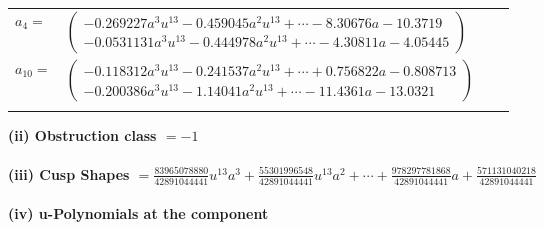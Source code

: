 \documentclass[1p]{elsarticle_modified}
\theoremstyle{definition}
\begin{document}
\begin{tabular}{m{7pt} m{180pt} m{7pt} m{180pt} }
\flushright $a_{4}=$&$\begin{pmatrix}-0.269227 a^{3} u^{13}-0.459045 a^{2} u^{13}+\cdots-8.30676 a-10.3719\\-0.0531131 a^{3} u^{13}-0.444978 a^{2} u^{13}+\cdots-4.30811 a-4.05445\end{pmatrix}$ \\
\flushright $a_{10}=$&$\begin{pmatrix}-0.118312 a^{3} u^{13}-0.241537 a^{2} u^{13}+\cdots+0.756822 a-0.808713\\-0.200386 a^{3} u^{13}-1.14041 a^{2} u^{13}+\cdots-11.4361 a-13.0321\end{pmatrix}$\\&\end{tabular}
\flushleft \textbf{(ii) Obstruction class $= -1$}\\~\\
\flushleft \textbf{(iii) Cusp Shapes $= \frac{83965078880}{42891044441} u^{13} a^3+\frac{55301996548}{42891044441} u^{13} a^2+\cdots+\frac{978297781868}{42891044441} a+\frac{571131040218}{42891044441}$}\\~\\
\newpage\renewcommand{\arraystretch}{1}
\flushleft \textbf{(iv) u-Polynomials at the component}\newline \\
\end{document}
